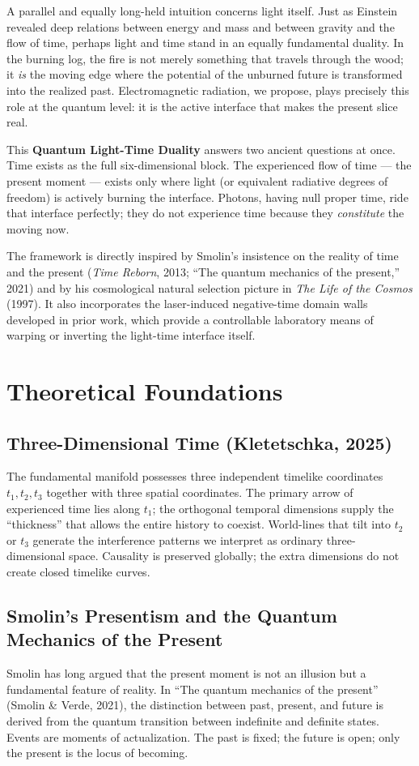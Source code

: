 \documentclass[11pt,a4paper]{article}
\begin{document}
A parallel and equally long-held intuition concerns light itself. Just as Einstein revealed deep relations between energy and mass and between gravity and the flow of time, perhaps light and time stand in an equally fundamental duality. In the burning log, the fire is not merely something that travels through the wood; it \textit{is} the moving edge where the potential of the unburned future is transformed into the realized past. Electromagnetic radiation, we propose, plays precisely this role at the quantum level: it is the active interface that makes the present slice real.

This \textbf{Quantum Light-Time Duality} answers two ancient questions at once. Time exists as the full six-dimensional block. The experienced flow of time — the present moment — exists only where light (or equivalent radiative degrees of freedom) is actively burning the interface. Photons, having null proper time, ride that interface perfectly; they do not experience time because they \textit{constitute} the moving now.

The framework is directly inspired by Smolin's insistence on the reality of time and the present (\textit{Time Reborn}, 2013; ``The quantum mechanics of the present,'' 2021) and by his cosmological natural selection picture in \textit{The Life of the Cosmos} (1997). It also incorporates the laser-induced negative-time domain walls developed in prior work, which provide a controllable laboratory means of warping or inverting the light-time interface itself.

\section{Theoretical Foundations}

\subsection{Three-Dimensional Time (Kletetschka, 2025)}
The fundamental manifold possesses three independent timelike coordinates $t_1, t_2, t_3$ together with three spatial coordinates. The primary arrow of experienced time lies along $t_1$; the orthogonal temporal dimensions supply the ``thickness'' that allows the entire history to coexist. World-lines that tilt into $t_2$ or $t_3$ generate the interference patterns we interpret as ordinary three-dimensional space. Causality is preserved globally; the extra dimensions do not create closed timelike curves.

\subsection{Smolin's Presentism and the Quantum Mechanics of the Present}
Smolin has long argued that the present moment is not an illusion but a fundamental feature of reality. In ``The quantum mechanics of the present'' (Smolin \& Verde, 2021), the distinction between past, present, and future is derived from the quantum transition between indefinite and definite states. Events are moments of actualization. The past is fixed; the future is open; only the present is the locus of becoming.
\end{document}
